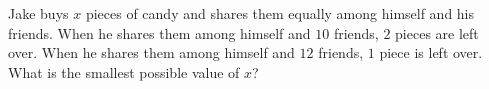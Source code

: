Jake buys $x$ pieces of candy and shares them equally among himself and his friends. When he shares them among himself and $10$ friends, $2$ pieces are left over. When he shares them among himself and $12$ friends, $1$ piece is left over. What is the smallest possible value of $x$?

